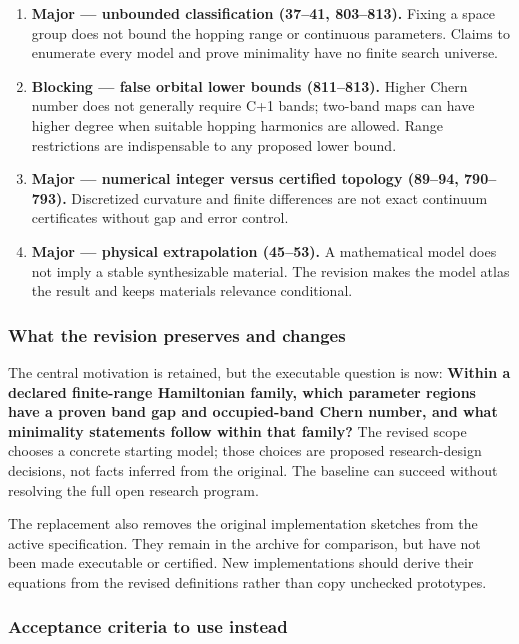 \documentclass[
  11pt,
]{article}
\begin{document}
\begin{enumerate}
\def\labelenumi{\arabic{enumi}.}
\item
  \textbf{Major --- unbounded classification (37--41, 803--813).} Fixing
  a space group does not bound the hopping range or continuous
  parameters. Claims to enumerate every model and prove minimality have
  no finite search universe.
\item
  \textbf{Blocking --- false orbital lower bounds (811--813).} Higher
  Chern number does not generally require \textbar C\textbar+1 bands;
  two-band maps can have higher degree when suitable hopping harmonics
  are allowed. Range restrictions are indispensable to any proposed
  lower bound.
\item
  \textbf{Major --- numerical integer versus certified topology (89--94,
  790--793).} Discretized curvature and finite differences are not exact
  continuum certificates without gap and error control.
\item
  \textbf{Major --- physical extrapolation (45--53).} A mathematical
  model does not imply a stable synthesizable material. The revision
  makes the model atlas the result and keeps materials relevance
  conditional.
\end{enumerate}

\subsubsection{What the revision preserves and changes}

The central motivation is retained, but the executable question is now:
\textbf{Within a declared finite-range Hamiltonian family, which
parameter regions have a proven band gap and occupied-band Chern number,
and what minimality statements follow within that family?} The revised
scope chooses a concrete starting model; those choices are proposed
research-design decisions, not facts inferred from the original. The
baseline can succeed without resolving the full open research program.

The replacement also removes the original implementation sketches from
the active specification. They remain in the archive for comparison, but
have not been made executable or certified. New implementations should
derive their equations from the revised definitions rather than copy
unchecked prototypes.

\subsubsection{Acceptance criteria to use instead}
\end{document}
